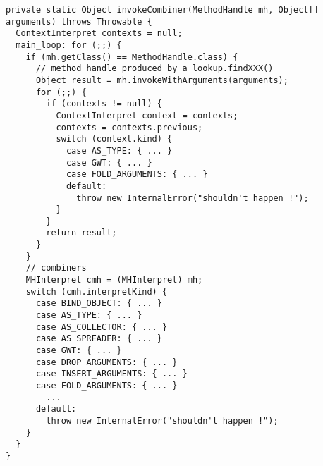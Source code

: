 {\tiny \begin{verbatim}
private static Object invokeCombiner(MethodHandle mh, Object[] arguments) throws Throwable {
  ContextInterpret contexts = null;
  main_loop: for (;;) {
    if (mh.getClass() == MethodHandle.class) {
      // method handle produced by a lookup.findXXX()
      Object result = mh.invokeWithArguments(arguments);
      for (;;) {
        if (contexts != null) {
          ContextInterpret context = contexts;
          contexts = contexts.previous;
          switch (context.kind) {
            case AS_TYPE: { ... }
            case GWT: { ... }
            case FOLD_ARGUMENTS: { ... }
            default:
              throw new InternalError("shouldn't happen !");
          }
        }
        return result;
      }
    }
    // combiners
    MHInterpret cmh = (MHInterpret) mh;
    switch (cmh.interpretKind) {
      case BIND_OBJECT: { ... }
      case AS_TYPE: { ... }
      case AS_COLLECTOR: { ... }
      case AS_SPREADER: { ... }
      case GWT: { ... }
      case DROP_ARGUMENTS: { ... }
      case INSERT_ARGUMENTS: { ... }
      case FOLD_ARGUMENTS: { ... }
        ...
      default:
        throw new InternalError("shouldn't happen !");
    }
  }
}
\end{verbatim} }